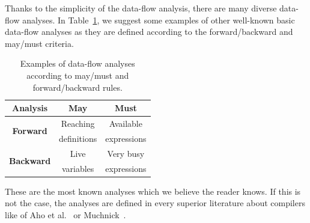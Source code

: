 Thanks to the simplicity of the data-flow analysis, there are many diverse
data-flow analyses. In Table~\ref{tab:data_flow_examples}, we suggest some
examples of other well-known basic data-flow analyses as they are defined
according to the forward/backward and may/must criteria.
\begin{table}[tb]
\begin{center}
\begin{tabular}{|c||c|c|} \hline
\textbf{Analysis}& \textbf{May}& \textbf{Must} \\ \hline\hline
\multirow{2}{*}{\textbf{Forward}}
  & Reaching    & Available   \\
  & definitions & expressions \\ \hline
\multirow{2}{*}{\textbf{Backward}}
  & Live        & Very busy   \\
  & variables   & expressions \\ \hline
\end{tabular}
\end{center}
    \caption{Examples of data-flow analyses according to may/must and
    forward/backward rules.}
  \label{tab:data_flow_examples}
\end{table}
These are the most known analyses which we believe the reader knows. If this
is not the case, the analyses are defined in every superior literature about
compilers like of Aho et al.~\cite{dragon} or Muchnick~\cite{muchnick}.


